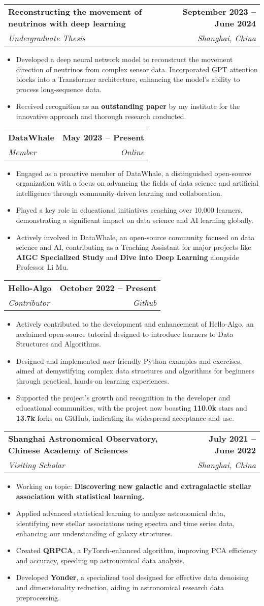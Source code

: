 \documentclass[letterpaper,11pt]{article}
\makeatletter
\newcommand{\resumeItem}[1]{
  \item\small{
    {#1 \vspace{-2pt}}
  }
}
\newcommand{\resumeSubheading}[4]{
  \vspace{-2pt}\item
    \begin{tabular*}{1.0\textwidth}[t]{l@{\extracolsep{\fill}}r}
      \textbf{#1} & \textbf{\small #2} \\
      \textit{\small#3} & \textit{\small #4} \\
    \end{tabular*}\vspace{-7pt}
}
\newcommand{\resumeItemListStart}{\begin{itemize}}
\newcommand{\resumeItemListEnd}{\end{itemize}\vspace{-5pt}}
\makeatother
\begin{document}
    \resumeSubheading
      {Reconstructing the movement of neutrinos with deep learning}{September 2023 -- June 2024}
      {Undergraduate Thesis}{Shanghai, China}
      \resumeItemListStart
        \resumeItem{Developed a deep neural network model to reconstruct the movement direction of neutrinos from complex sensor data. Incorporated GPT attention blocks into a Transformer architecture, enhancing the model's ability to process long-sequence data.}
        \resumeItem{Received recognition as an \textbf{outstanding paper} by my institute for the innovative approach and thorough research conducted.}
      \resumeItemListEnd

    \resumeSubheading
      {DataWhale}{May 2023 -- Present}
      {Member}{Online}
      \resumeItemListStart
        \resumeItem{Engaged as a proactive member of DataWhale, a distinguished open-source organization with a focus on advancing the fields of data science and artificial intelligence through community-driven learning and collaboration.}
        \resumeItem{Played a key role in educational initiatives reaching over 10,000 learners, demonstrating a significant impact on data science and AI learning globally.}
        \resumeItem{Actively involved in DataWhale, an open-source community focused on data science and AI, contributing as a Teaching Assistant for major projects like \textbf{AIGC Specialized Study} and \textbf{Dive into Deep Learning} alongside Professor Li Mu.}
      \resumeItemListEnd

    \resumeSubheading
      {Hello-Algo}{October 2022 -- Present}
      {Contributor}{Github}
      \resumeItemListStart
        \resumeItem{Actively contributed to the development and enhancement of Hello-Algo, an acclaimed open-source tutorial designed to introduce learners to Data Structures and Algorithms.}
        \resumeItem{Designed and implemented user-friendly Python examples and exercises, aimed at demystifying complex data structures and algorithms for beginners through practical, hands-on learning experiences.}
        \resumeItem{Supported the project's growth and recognition in the developer and educational communities, with the project now boasting \textbf{110.0k} stars and \textbf{13.7k} forks on GitHub, indicating its widespread acceptance and use.}
      \resumeItemListEnd

          \resumeSubheading
      {Shanghai Astronomical Observatory, Chinese Academy of Sciences}{July 2021 -- June 2022}
      {Visiting Scholar}{Shanghai, China}
      \resumeItemListStart
        \resumeItem{Working on topic: \textbf{Discovering new galactic and extragalactic stellar association with statistical learning.}}
        \resumeItem{Applied advanced statistical learning to analyze astronomical data, identifying new stellar associations using spectra and time series data, enhancing our understanding of galaxy structures.}
        \resumeItem{Created \textbf{QRPCA}, a PyTorch-enhanced algorithm, improving PCA efficiency and accuracy, speeding up astronomical data analysis.}
        \resumeItem{Developed \textbf{Yonder}, a specialized tool designed for effective data denoising and dimensionality reduction, aiding in astronomical research data preprocessing.}
      \resumeItemListEnd
\end{document}
